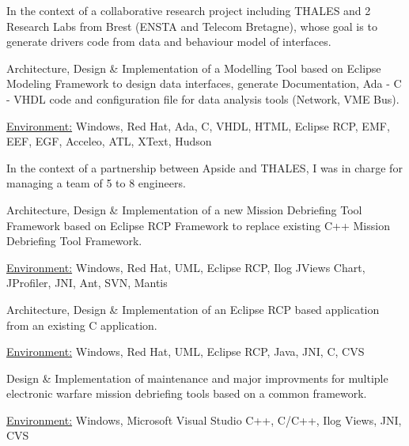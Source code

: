 \documentclass[10pt,letterpaper]{resume/resume}
\begin{document}
\begin{minipage}[t]{\linewidth}
\par In the context of a collaborative research project including THALES and 2 Research Labs from Brest (ENSTA and Telecom Bretagne), whose goal is to generate drivers code from data and behaviour model of interfaces.
\par Architecture, Design \& Implementation of a Modelling Tool based on Eclipse Modeling Framework to design data interfaces, generate Documentation, Ada - C - VHDL code and configuration file for data analysis tools (Network, VME Bus).
\par\underline{Environment:} Windows, Red Hat, Ada, C, VHDL, HTML, Eclipse RCP, EMF, EEF, EGF, Acceleo, ATL, XText, Hudson

\par In the context of a partnership between Apside and THALES, I was in charge for managing a team of 5 to 8 engineers.
\par Architecture, Design \& Implementation of a new Mission Debriefing Tool Framework based on Eclipse RCP Framework to replace existing C++ Mission Debriefing Tool Framework.
\par\underline{Environment:} Windows, Red Hat, UML, Eclipse RCP, Ilog JViews Chart, JProfiler, JNI, Ant, SVN, Mantis
%

\par Architecture, Design \& Implementation of an Eclipse RCP based application from an existing C application.
\par\underline{Environment:} Windows, Red Hat, UML, Eclipse RCP, Java, JNI, C, CVS

\par Design \& Implementation of maintenance and major improvments for multiple electronic warfare mission debriefing tools based on a common framework.
\par\underline{Environment:} Windows, Microsoft Visual Studio C++, C/C++, Ilog Views, JNI, CVS


\end{minipage}
\end{document}
